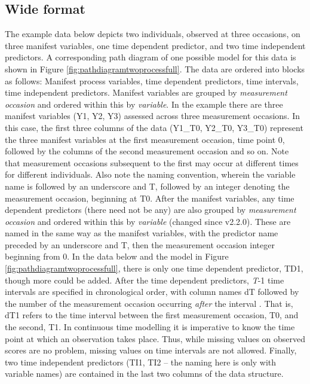 \documentclass[nojss]{jss}\usepackage[]{graphicx}\usepackage[]{color}
\begin{document}
\subsection{Wide format} \label{sec:datawide}\nopagebreak 
The example data below depicts two individuals, observed at three occasions, on three manifest variables, one time dependent predictor, and two time independent predictors. A corresponding path diagram of one possible model for this data is shown in Figure \ref{fig:pathdiagramtwoprocessfull}. The data are ordered into blocks as follows: Manifest process variables, time dependent predictors, time intervals, time independent predictors. Manifest variables are grouped by \textit{measurement occasion} and ordered within this by \textit{variable}. In the example there are three manifest variables (Y1, Y2, Y3) assessed across three measurement occasions. In this case, the first three columns of the data (Y1\_T0, Y2\_T0, Y3\_T0) represent the three manifest variables at the first measurement occasion, time point 0, followed by the columns of the second measurement occasion and so on. Note that measurement occasions subsequent to the first may occur at different times for different individuals.  Also note the naming convention, wherein the variable name is followed by an underscore and T, followed by an integer denoting the measurement occasion, beginning at T0.  After the manifest variables, any time dependent predictors (there need not be any) are also grouped by \textit{measurement occasion} and ordered within this by \textit{variable} (changed since v2.2.0). These are named in the same way as the manifest variables, with the predictor name preceded by an underscore and T, then the measurement occasion integer beginning from 0. In the data below and the model in Figure \ref{fig:pathdiagramtwoprocessfull}, there is only one time dependent predictor, TD1, though more could be added. After the time dependent predictors, \textit{T}-1 time intervals are specified in chronological order, with column names dT followed by the number of the measurement occasion occurring \textit{after} the interval . That is, dT1 refers to the time interval between the first measurement occasion, T0, and the second, T1.  In continuous time modelling it is imperative to know the time point at which an observation takes place. Thus, while missing values on observed scores are no problem, missing values on time intervals are not allowed. Finally, two time independent predictors (TI1, TI2 -- the naming here is only with variable names) are contained in the last two columns of the data structure.
\end{document}
